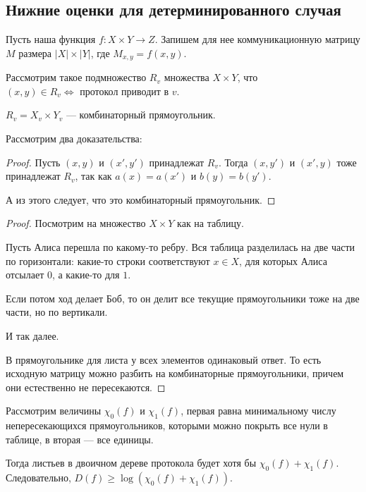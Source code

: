 \subsection{Нижние оценки для детерминированного случая}
Пусть наша функция $ f\colon X \times Y \to  Z$. 
Запишем  для нее коммуникационную матрицу $ M$ размера $ \lvert X \rvert \times \lvert Y \rvert $, где $ M_{x, y} = f(x, y)$.

Рассмотрим такое подмножество $ R_v$ множества $ X \times Y$, что $(x, y) \in R_v \Longleftrightarrow \text{ протокол приводит в }  v$.

\begin{lm}
	$ R_v = X_v \times Y_v$ --- комбинаторный прямоугольник.
\end{lm}
Рассмотрим два доказательства:
\begin{proof}
	Пусть $ (x, y)$ и  $ (x', y')$ принадлежат  $ R_v$. Тогда  $ (x, y')$ и  $ (x', y)$ тоже принадлежат  $ R_v$, так как $ a(x) = a(x')$ и  $ b(y) = b(y')$.

	А из этого следует, что это комбинаторный прямоугольник.
\end{proof}
\begin{proof}
	Посмотрим на множество $ X\times Y$ как на таблицу.

    Пусть Алиса перешла по какому-то ребру. Вся таблица разделилась на две части по горизонтали: какие-то строки соответствуют $ x \in X$, для которых Алиса отсылает  $ 0$, а какие-то для $ 1$. 

	Если потом ход делает Боб, то он делит все текущие прямоугольники тоже на две части, но по вертикали. 

И так далее.

В прямоугольнике для листа у всех элементов одинаковый ответ. То есть исходную матрицу можно разбить на комбинаторные прямоугольники, причем они естественно не пересекаются.
\end{proof}

\vspace{1em}
Рассмотрим величины $ \chi_{0}(f)$ и $ \chi_1(f)$, первая равна минимальному числу непересекающихся прямоугольников, которыми можно покрыть все нули в таблице, в вторая --- все единицы.

Тогда листьев в двоичном дереве протокола будет хотя бы $ \chi_0(f) + \chi_1(f)$. Следовательно, $ D(f) \ge \log( \chi_0(f) + \chi_1(f))$.

